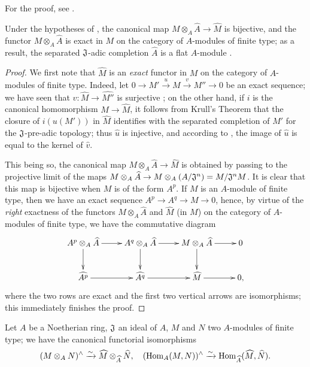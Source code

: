 For the proof, see \cite[p.~2--04]{I-1}.

\begin{cor}[7.3.3]
\label{0.7.3.3}
Under the hypotheses of , the canonical map
$M\otimes_A\widehat{A}\to\widehat{M}$ is bijective, and the functor $M\otimes_A\widehat{A}$
is exact in $M$ on the category of $A$-modules of finite type; as a result, the separated
$\mathfrak{J}$-adic completion $\widehat{A}$ is a flat $A$-module
.
\end{cor}

\begin{proof}
\label{proof-0.7.3.3}
We first note that $\widehat{M}$ is an {\em exact} functor in $M$ on the category of
$A$-modules of finite type. Indeed, let $0\to M'\xrightarrow{u}M\xrightarrow{v}M''\to 0$ be
an exact sequence; we have seen that $\widehat{v}:\widehat{M}\to\widehat{M''}$ is surjective
; on the other hand, if $i$ is the canonical homomorphism
$M\to\widehat{M}$, it follows from Krull's Theorem  that the
closure of $i(u(M'))$ in $\widehat{M}$ identifies with the separated completion of $M'$ for
the $\mathfrak{J}$-pre-adic topology; thus $\widehat{u}$ is injective, and according to
, the image of $\widehat{u}$ is equal to the kernel of
$\widehat{v}$.

This being so, the canonical map $M\otimes_A\widehat{A}\to\widehat{M}$ is obtained by passing
to the projective limit of the maps
$M\otimes_A\widehat{A}\to M\otimes_A(A/\mathfrak{J}^n)=M/\mathfrak{J}^n M$. It is clear that
this map is bijective when $M$ is of the form $A^p$. If $M$ is an $A$-module of finite type,
then we have an exact sequence $A^p\to A^q\to M\to 0$, hence, by virtue of the {\em right}
exactness of the functors $M\otimes_A\widehat{A}$ and $\widehat{M}$ (in $M$) on the category
of $A$-modules of finite type, we have the commutative diagram
\[
  \xymatrix{
    A^p\otimes_A\widehat{A}\ar[r]\ar[d] &
    A^q\otimes_A\widehat{A}\ar[r]\ar[d] &
    M\otimes_A\widehat{A}\ar[r]\ar[d] &
    0\\
    \widehat{A^p}\ar[r] &
    \widehat{A^q}\ar[r] &
    \widehat{M}\ar[r] &
    0,
  }
\]
where the two rows are exact and the first two vertical arrows are isomorphisms; this
immediately finishes the proof.
\end{proof}

\begin{cor}[7.3.4]
\label{0.7.3.4}
Let $A$ be a Noetherian ring, $\mathfrak{J}$ an ideal of $A$, $M$ and $N$ two $A$-modules of
finite type; we have the canonical functorial isomorphisms
\[
  (M\otimes_A N)^\wedge\xrightarrow{\sim}\widehat{M}\otimes_{\widehat{A}}\widehat{N},
  \quad
  ({\mathop{\mathrm{Hom}}\nolimits}_A(M,N))^\wedge\xrightarrow{\sim}{\mathop{\mathrm{Hom}}\nolimits}_{\widehat{A}}(\widehat{M},\widehat{N}).
\]
\end{cor}

